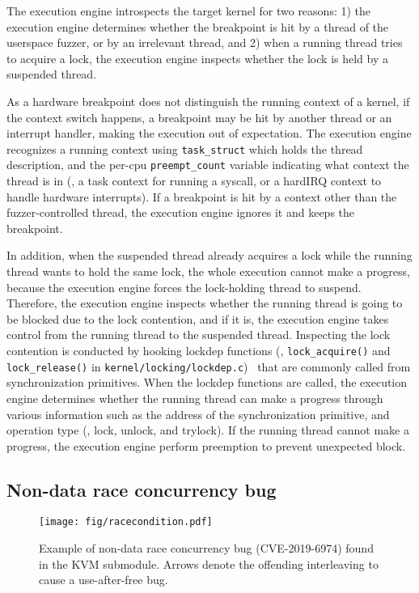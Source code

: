 The execution engine introspects the target kernel for two reasons: 1)
the execution engine determines whether the breakpoint is hit by a
thread of the userspace fuzzer, or by an irrelevant thread, and 2)
when a running thread tries to acquire a lock, the execution engine
inspects whether the lock is held by a suspended thread.

As a hardware breakpoint does not distinguish the running context of a
kernel, if the context switch happens, a breakpoint may be hit by
another thread or an interrupt handler, making the execution out of
expectation.
%
The execution engine recognizes a running context using
\texttt{task_struct} which holds the thread description, and the
per-cpu \texttt{preempt_count} variable indicating what context the
thread is in (\eg, a task context for running a syscall, or a hardIRQ
context to handle hardware interrupts).
%
If a breakpoint is hit by a context other than the fuzzer-controlled
thread, the execution engine ignores it and keeps the breakpoint.


In addition, when the suspended thread already acquires a lock while
the running thread wants to hold the same lock, the whole execution
cannot make a progress, because the execution engine forces the
lock-holding thread to suspend.
%
Therefore, the execution engine inspects whether the running thread is
going to be blocked due to the lock contention, and if it is, the
execution engine takes control from the running thread to the
suspended thread.
%
Inspecting the lock contention is conducted by hooking lockdep
functions (\ie, \texttt{lock_acquire()} and \texttt{lock_release()} in
\texttt{kernel/locking/lockdep.c})~\cite{lockdep} that are commonly
called from synchronization primitives.
%
When the lockdep functions are called, the execution engine determines
whether the running thread can make a progress through various
information such as the address of the synchronization primitive, and
operation type (\ie, lock, unlock, and trylock).
%
If the running thread cannot make a progress, the execution engine
perform preemption to prevent unexpected block.

\subsection{Non-data race concurrency bug}
\label{s:appendix:datarace}

\begin{figure}[h]
  \centering
  \texttt{[image: fig/racecondition.pdf]}
  \caption{Example of non-data race concurrency bug (CVE-2019-6974)
    found in the KVM submodule. Arrows denote the offending
    interleaving to cause a use-after-free bug.}
  \label{fig:concurrencybugs}
\end{figure}

